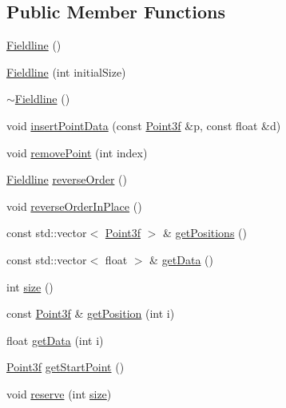 \subsection*{Public Member Functions}
\begin{DoxyCompactItemize}
\item 
\hyperlink{classccmc_1_1_fieldline_a10b0290c13c4170e468860dc2143fc20}{Fieldline} ()
\item 
\hyperlink{classccmc_1_1_fieldline_a981328dcb0f92191940ef86d76946457}{Fieldline} (int initial\-Size)
\item 
\hyperlink{classccmc_1_1_fieldline_a08964ce404b1cfd462c5d2038d7c1e9e}{$\sim$\-Fieldline} ()
\item 
void \hyperlink{classccmc_1_1_fieldline_a88a8fc4c0ad61639b9138f8dd57bf8e0}{insert\-Point\-Data} (const \hyperlink{classccmc_1_1_point3f}{Point3f} \&p, const float \&d)
\item 
void \hyperlink{classccmc_1_1_fieldline_a23509bcd88a0a7605c35afaafa58c5c9}{remove\-Point} (int index)
\item 
\hyperlink{classccmc_1_1_fieldline}{Fieldline} \hyperlink{classccmc_1_1_fieldline_a07884d34cad97f14b6810cf23ee003c0}{reverse\-Order} ()
\item 
void \hyperlink{classccmc_1_1_fieldline_a700a5c623e608f3cbc89455bc4e63b83}{reverse\-Order\-In\-Place} ()
\item 
const std\-::vector$<$ \hyperlink{classccmc_1_1_point3f}{Point3f} $>$ \& \hyperlink{classccmc_1_1_fieldline_a0d82bca39360b88914fc312dcb441fb8}{get\-Positions} ()
\item 
const std\-::vector$<$ float $>$ \& \hyperlink{classccmc_1_1_fieldline_af87fd7cd8f79631a255f64d40665fccf}{get\-Data} ()
\item 
int \hyperlink{classccmc_1_1_fieldline_abc4b63ac9b72acd2e6f26b51f659500c}{size} ()
\item 
const \hyperlink{classccmc_1_1_point3f}{Point3f} \& \hyperlink{classccmc_1_1_fieldline_a9f1b0541029d59589902e1ffe2ef75c5}{get\-Position} (int i)
\item 
float \hyperlink{classccmc_1_1_fieldline_afe04791c767345b742c4da719709ddf0}{get\-Data} (int i)
\item 
\hyperlink{classccmc_1_1_point3f}{Point3f} \hyperlink{classccmc_1_1_fieldline_aa693457613225094763e0bc33fe5d730}{get\-Start\-Point} ()
\item 
void \hyperlink{classccmc_1_1_fieldline_a7a4edd677b1e1542166ac0aad783087e}{reserve} (int \hyperlink{classccmc_1_1_fieldline_abc4b63ac9b72acd2e6f26b51f659500c}{size})

\end{DoxyCompactItemize}

